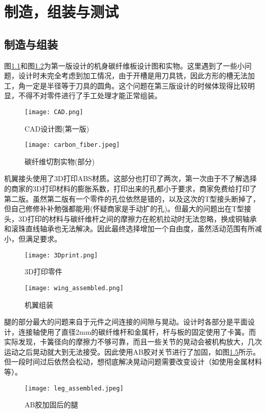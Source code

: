 
\chapter{制造，组装与测试}
\label{cha:chapter03}
\section{制造与组装}
图\ref{fig:CAD}和图\ref{fig:carbon_fiber}为第一版设计的机身碳纤维板设计图和实物。这里遇到了一些小问题，设计时未完全考虑到加工情况，由于开槽是用刀具铣，因此方形的槽无法加工，角一定是半径等于刀具的圆角。这个问题在第三版设计的时候体现得比较明显，不得不对零件进行了手工处理才能正常组装。
\begin{figure}[H]
  \centering%
  \texttt{[image: CAD.png]}
  \caption{CAD设计图(第一版)}
  \label{fig:CAD}
\end{figure}
\begin{figure}[H]
  \centering%
  \texttt{[image: carbon\_fiber.jpeg]}
  \caption{碳纤维切割实物(部分)}
  \label{fig:carbon_fiber}
\end{figure}
机翼接头使用了3D打印ABS材质。这部分也打印了两次，第一次由于不了解选择的商家的3D打印材料的膨胀系数，打印出来的孔都小于要求，商家免费给打印了第二版。虽然第二版有一个零件的孔位依然是错的，以及这次的T型接头断掉了，但自己修修补补勉强都能用(怀疑商家是手动扩的孔)。但最大的问题出在T型接头，3D打印的材料与碳纤维杆之间的摩擦力在舵机拉动时无法忽略，换成铜轴承和滚珠直线轴承也无法解决。因此最终选择增加一个自由度，虽然活动范围有所减小，但满足要求。
\begin{figure}[H]
  \centering%
  \texttt{[image: 3Dprint.png]}
  \caption{3D打印零件}
  \label{fig:3Dprint}
\end{figure}
\begin{figure}[H]
  \centering%
  \texttt{[image: wing\_assembled.png]}
  \caption{机翼组装}
  \label{fig:wing_assembled}
\end{figure}
腿的部分最大的问题来自于元件之间连接的间隙与晃动。设计时各部分是平面设计，连接轴使用了直径2mm的碳纤维杆和金属杆，杆与板的固定使用了卡簧。而实际发现，卡簧径向的摩擦力不够可靠，而且一些关节的晃动会被机构放大，几次运动之后晃动就大到无法接受。因此使用AB胶对关节进行了加固，如图\ref{fig:leg_assembled}所示。但一段时间过后依然会松动，想彻底解决晃动问题需要改变设计（如使用金属材料等）。
\begin{figure}[H]
  \centering%
  \texttt{[image: leg\_assembled.jpeg]}
  \caption{AB胶加固后的腿}
  \label{fig:leg_assembled}
\end{figure}
